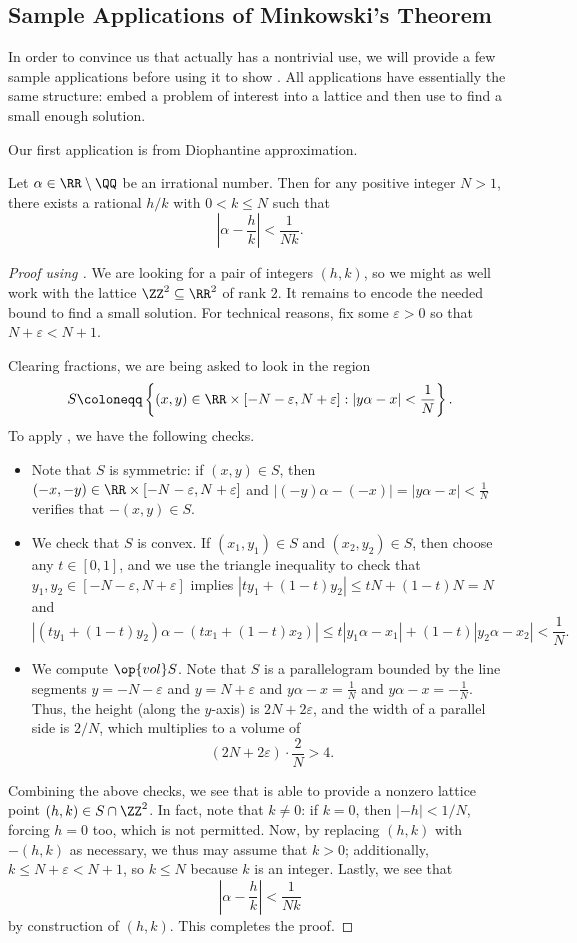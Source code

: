 \documentclass[../notes.tex]{subfiles}
\begin{document}
\subsection{Sample Applications of Minkowski's Theorem}
In order to convince us that  actually has a nontrivial use, we will provide a few sample applications before using it to show . All applications have essentially the same structure: embed a problem of interest into a lattice and then use  to find a small enough solution.

Our first application is from Diophantine approximation.
\begin{proposition} \label{prop:dirichlet-approx}
	Let $\alpha\in\RR\setminus\QQ$ be an irrational number. Then for any positive integer $N>1$, there exists a rational $h/k$ with $0<k\le N$ such that
	\[\left|\alpha-\frac hk\right|<\frac1{Nk}.\]
\end{proposition}
\begin{proof}[Proof using ]
	We are looking for a pair of integers $(h,k)$, so we might as well work with the lattice $\ZZ^2\subseteq\RR^2$ of rank $2$. It remains to encode the needed bound to find a small solution. For technical reasons, fix some $\varepsilon>0$ so that $N+\varepsilon<N+1$.
	
	Clearing fractions, we are being asked to look in the region
	\[S\coloneqq\left\{(x,y)\in\RR\times[-N-\varepsilon,N+\varepsilon]:\left|y\alpha-x\right|<\frac1N\right\}.\]
	To apply , we have the following checks.
	\begin{itemize}
		\item Note that $S$ is symmetric: if $(x,y)\in S$, then $(-x,-y)\in\RR\times[-N-\varepsilon,N+\varepsilon]$ and $\left|(-y)\alpha-(-x)\right|=\left|y\alpha-x\right|<\frac1N$ verifies that $-(x,y)\in S$.
		\item We check that $S$ is convex. If $(x_1,y_1)\in S$ and $(x_2,y_2)\in S$, then choose any $t\in[0,1]$, and we use the triangle inequality to check that $y_1,y_2\in[-N-\varepsilon,N+\varepsilon]$ implies $\left|ty_1+(1-t)y_2\right|\le tN+(1-t)N=N$ and
		\[\left|(ty_1+(1-t)y_2)\alpha-(tx_1+(1-t)x_2)\right|\le t\left|y_1\alpha-x_1\right|+(1-t)\left|y_2\alpha-x_2\right|<\frac1N.\]
		\item We compute $\op{vol}S$. Note that $S$ is a parallelogram bounded by the line segments $y=-N-\varepsilon$ and $y=N+\varepsilon$ and $y\alpha-x=\frac1N$ and $y\alpha-x=-\frac1N$. Thus, the height (along the $y$-axis) is $2N+2\varepsilon$, and the width of a parallel side is $2/N$, which multiplies to a volume of
		\[(2N+2\varepsilon)\cdot\frac2N>4.\]
	\end{itemize}
	Combining the above checks, we see that  is able to provide a nonzero lattice point $(h,k)\in S\cap\ZZ^2$. In fact, note that $k\ne0$: if $k=0$, then $\left|-h\right|<1/N$, forcing $h=0$ too, which is not permitted. Now, by replacing $(h,k)$ with $-(h,k)$ as necessary, we thus may assume that $k>0$; additionally, $k\le N+\varepsilon<N+1$, so $k\le N$ because $k$ is an integer. Lastly, we see that
	\[\left|\alpha-\frac hk\right|<\frac1{Nk}\]
	by construction of $(h,k)$. This completes the proof.
\end{proof}
\end{document}
